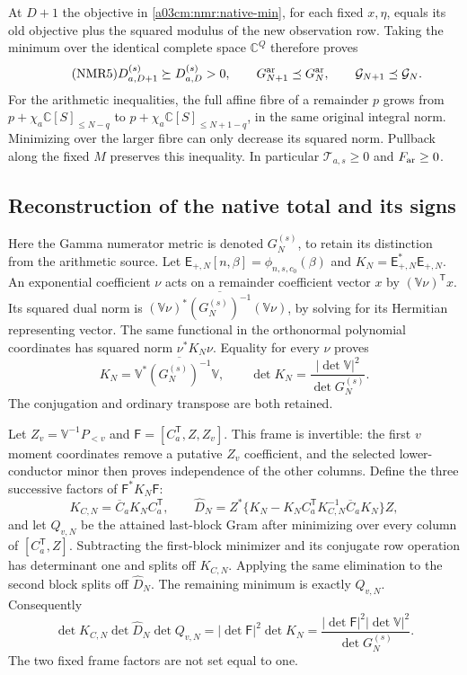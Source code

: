 At $D+1$ the objective in \eqref{a03cm:nmr:native-min}, for each fixed
$x,\eta$, equals its old objective plus the squared modulus of the
new observation row. Taking the minimum over the identical complete
space $\mathbb C^Q$ therefore proves
\begin{equation}\tag{NMR5}\label{a03cm:nmr:monotonicity}
D_{a,D+1}^{(s)}\succeq D_{a,D}^{(s)}>0,\qquad
G_{N+1}^{\rm ar}\preceq G_N^{\rm ar},\qquad
\mathcal G_{N+1}\preceq\mathcal G_N .
\end{equation}
For the arithmetic inequalities, the full affine fibre of a remainder
$p$ grows from $p+\chi_a\mathbb C[S]_{\leq N-q}$ to
$p+\chi_a\mathbb C[S]_{\leq N+1-q}$, in the same original integral
norm. Minimizing over the larger fibre can only decrease its squared
norm. Pullback along the fixed $M$ preserves this inequality.
In particular $\mathcal T_{a,s}\geq0$ and $F_{\rm ar}\geq0$.

\subsection{Reconstruction of the native total and its signs}
Here the Gamma numerator metric is denoted $G_N^{(s)}$, to retain
its distinction from the arithmetic source. Let
$\mathsf E_{+,N}[n,\beta]=\phi_{n,s,c_0}(\beta)$ and
$K_N=\mathsf E_{+,N}^*\mathsf E_{+,N}$.
An exponential coefficient $\nu$ acts on a remainder coefficient
vector $x$ by $(\mathbb V\nu)^{\mathsf T}x$.
Its squared dual norm is
$(\mathbb V\nu)^*\overline{(G_N^{(s)})^{-1}}(\mathbb V\nu)$,
by solving for its Hermitian representing vector.
The same functional in the orthonormal polynomial coordinates has
squared norm $\nu^*K_N\nu$. Equality for every $\nu$ proves
\begin{equation}\tag{NMR6}\label{a03cm:nmr:dual}
K_N=\mathbb V^*\overline{(G_N^{(s)})^{-1}}\mathbb V,\qquad
\det K_N=\frac{|\det\mathbb V|^2}{\det G_N^{(s)}} .
\end{equation}
The conjugation and ordinary transpose are both retained.

Let $Z_v=\mathbb V^{-1}P_{<v}$ and
$\mathsf F=[C_a^{\mathsf T},Z,Z_v]$. This frame is invertible:
the first $v$ moment coordinates remove a putative $Z_v$ coefficient,
and the selected lower-conductor minor then proves independence of
the other columns. Define the three successive factors of
$\mathsf F^*K_N\mathsf F$:
\[
K_{C,N}=\overline C_aK_NC_a^{\mathsf T},\qquad
\widehat D_N=Z^*\{K_N-K_NC_a^{\mathsf T}K_{C,N}^{-1}
                                      \overline C_aK_N\}Z,
\]
and let $Q_{v,N}$ be the attained last-block Gram after minimizing
over every column of $[C_a^{\mathsf T},Z]$.
Subtracting the first-block minimizer and its conjugate row
operation has determinant one and splits off $K_{C,N}$.
Applying the same elimination to the second block splits off
$\widehat D_N$. The remaining minimum is exactly $Q_{v,N}$.
Consequently
\begin{equation}\tag{NMR7}\label{a03cm:nmr:factorization}
\det K_{C,N}\det\widehat D_N\det Q_{v,N}
=|\det\mathsf F|^2\det K_N
=\frac{|\det\mathsf F|^2|\det\mathbb V|^2}{\det G_N^{(s)}} .
\end{equation}
The two fixed frame factors are not set equal to one.

